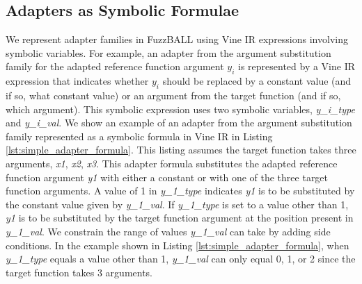 \subsection{Adapters as Symbolic Formulae}
\label{sec:adapter_formulae}
%
% 
% 
We represent adapter families in FuzzBALL using Vine IR expressions involving symbolic variables.
%
For example, an adapter from the argument substitution family for the adapted
reference function argument $y_i$ is represented by a Vine IR expression that indicates whether $y_i$ should be replaced by a constant value (and if so, what constant value) or an argument from the target function (and if so, which argument).
%
This symbolic expression uses two symbolic variables, \textit{y\_i\_type} and \textit{y\_i\_val}.
%
We show an example of an adapter from the argument substitution family represented as a symbolic formula in Vine IR in Listing \ref{lst:simple_adapter_formula}.
%
This listing assumes the target function takes three arguments, \textit{x1}, \textit{x2}, \textit{x3}.
%
This adapter formula substitutes the adapted reference function argument \textit{y1} with either a constant or with one of the three target function arguments.
%
A value of 1 in \textit{y\_1\_type} indicates \textit{y1} is to be substituted by the constant value given by \textit{y\_1\_val}.
%
If \textit{y\_1\_type} is set to a value other than 1, \textit{y1} is to be substituted by the target function argument at the position present in \textit{y\_1\_val}.
%
We constrain the range of values \textit{y\_1\_val} can take by adding side conditions. 
%
In the example shown in Listing \ref{lst:simple_adapter_formula}, when \textit{y\_1\_type} equals a value other than 1, \textit{y\_1\_val} can only equal 0, 1, or 2 since the target function takes 3 arguments.
%
